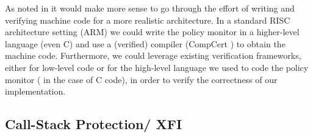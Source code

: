As noted in \cite{popl2015} it would make more sense to go
through the effort of writing and verifying machine code for a more
realistic architecture.  In a standard RISC architecture setting
(\EG ARM) we could write the policy monitor in a higher-level
language (even C) and use a (verified) compiler (\EG CompCert
\cite{leroy09:compcert}) to obtain the machine code. Furthermore, we
could leverage existing verification frameworks, either for low-level
code \cite{Chlipala2013,JensenBK13} or for the high-level language we
used to code the policy monitor (\EG
\cite{Appel:2011:VST:1987211.1987212} in the case of C code), in order
to verify the correctness of our implementation.



\subsection{Call-Stack Protection/ XFI}

